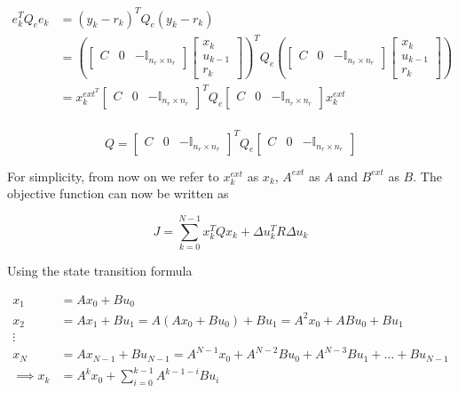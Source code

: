 \documentclass{article}
\begin{document}
$$
\begin{aligned}
  e_k^T Q_e e_k &= (y_k - r_k)^T Q_e (y_k - r_k) \\
  &= \left(
    \begin{bmatrix} C & 0 & -\mathbb{I}_{n_r \times n_r}
    \end{bmatrix}
    \begin{bmatrix}
      x_k \\
      u_{k-1} \\
      r_k
  \end{bmatrix}\right)^T Q_e
  \left(
    \begin{bmatrix} C & 0 & -\mathbb{I}_{n_r \times n_r}
    \end{bmatrix}
    \begin{bmatrix}
      x_k \\
      u_{k-1} \\
      r_k
  \end{bmatrix}\right) \\
  &= x_k^{ext^T}
  \begin{bmatrix} C & 0 & -\mathbb{I}_{n_r \times n_r}
  \end{bmatrix}^T Q_e
  \begin{bmatrix} C & 0 & -\mathbb{I}_{n_r \times n_r}
  \end{bmatrix} x_k^{ext} \\
\end{aligned}
$$

\begin{equation}
  Q =
  \begin{bmatrix} C & 0 & -\mathbb{I}_{n_r \times n_r}
  \end{bmatrix}^T Q_e
  \begin{bmatrix} C & 0 & -\mathbb{I}_{n_r \times n_r}
  \end{bmatrix}
\end{equation}

For simplicity, from now on we refer to $x_k^{ext}$ as $x_k$, $A^{ext}$ as $A$ and $B^{ext}$ as $B$.
The objective function can now be written as

$$
J = \sum_{k=0}^{N-1} x_k^T Q x_k + \Delta u_k^T R \Delta u_k
$$

Using the state transition formula

$$
\begin{aligned}
  x_1 &= A x_0 + B u_0 \\
  x_2 &= A x_1 + B u_1 = A(A x_0 + B u_0) + B u_1 = A^2 x_0 + A B u_0 + B u_1 \\
  \vdots \\
  x_N &= A x_{N-1} + B u_{N-1} = A^{N-1} x_0 + A^{N-2} B u_0 + A^{N-3} B u_1 + \ldots + B u_{N-1} \\
  \implies x_k &= A^k x_0 + \sum_{i=0}^{k-1} A^{k-1-i} B u_i
\end{aligned}
$$
\end{document}
